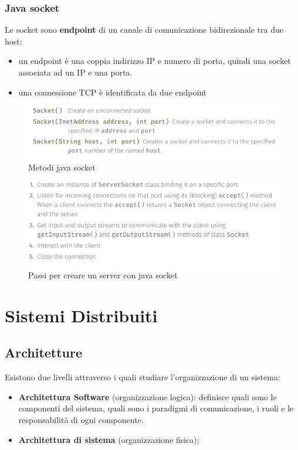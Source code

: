 \documentclass[12pt]{article}
\begin{document}
	\subsubsection{Java socket}
		Le socket sono \textbf{endpoint} di un canale di comunicazione bidirezionale tra due host:
		\begin{itemize}
			\item un endpoint è una coppia indirizzo IP e numero di porta, quindi una socket associata ad un IP e una porta.
			\item una connessione TCP è identificata da due endpoint
		\end{itemize}
		\begin{figure}[h!]
			\centering
			\includegraphics[scale=0.30]{img/soc.png}
			\caption{Metodi java socket}
		\end{figure}
		\begin{figure}[h!]
			\centering
			\includegraphics[scale=0.30]{img/echo.png}
			\caption{Passi per creare un server con java socket}
		\end{figure}
		
\section{Sistemi Distribuiti }
	\subsection{Architetture}
	Esistono due livelli attraverso i quali studiare l'organizzazione di un sistema:
	\begin{itemize}
		\item \textbf{Architettura Software} (organizzazione logica): definisce quali sono le componenti del sistema, quali sono i paradigmi di comunicazione, i ruoli e le responsabilità di ogni componente.
		\item \textbf{Architettura di sistema} (organizzazione fisica); 
	\end{itemize}
\end{document}
